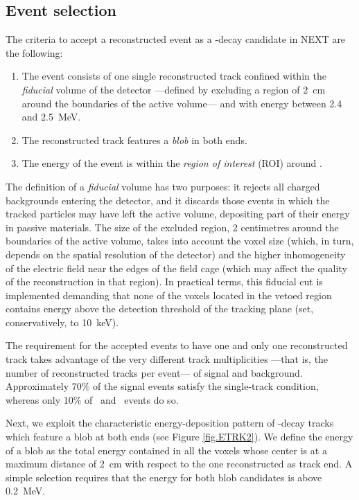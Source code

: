 \subsection{Event selection} \label{sec:EventSelection}

The criteria to accept a reconstructed event as a \bbonu-decay candidate in NEXT are the following:
\begin{enumerate}
\item The event consists of one single reconstructed track confined within the \emph{fiducial} volume of the detector ---\thinspace defined by excluding a region of 2~cm around the boundaries of the active volume\thinspace--- and with energy between 2.4 and 2.5~MeV.
\item The reconstructed track features a \emph{blob} in both ends.
\item The energy of the event is within the \emph{region of interest} (ROI) around \Qbb.
\end{enumerate}

The definition of a \emph{fiducial} volume has two purposes: it rejects all charged backgrounds entering the detector, and it discards those events in which the tracked particles may have left the active volume, depositing part of their energy in passive materials. The size of the excluded region, 2 centimetres around the boundaries of the active volume, takes into account the voxel size (which, in turn, depends on the spatial resolution of the detector) and the higher inhomogeneity of the electric field near the edges of the field cage (which may affect the quality of the reconstruction in that region). In practical terms, this fiducial cut is implemented demanding that none of the voxels located in the vetoed region contains energy above the detection threshold of the tracking plane (set, conservatively, to 10~keV).


The requirement for the accepted events to have one and only one reconstructed track takes advantage of the very different track multiplicities ---\thinspace that is, the number of reconstructed tracks per event\thinspace--- of signal and background. Approximately 70\% of the signal events satisfy the single-track condition, whereas only 10\% of \Tl\ and \Bi\ events do so. 

Next, we exploit the characteristic energy-deposition pattern of \bbonu-decay tracks which feature a blob at both ends (see Figure \ref{fig.ETRK2}). We define the energy of a blob as the total energy contained in all the voxels whose center is at a maximum distance of $2$~cm with respect to the one reconstructed as track end. A simple selection requires that the energy for both blob candidates is above  0.2~MeV.

